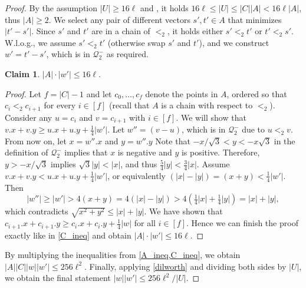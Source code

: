 \documentclass[11pt, letterpaper]{article}
\theoremstyle{plain}
\theoremstyle{definition}
\newtheorem{claim}{Claim}
\theoremstyle{remark}
\newcommand{\Q}{\mathcal{Q}}
\newcommand{\absolute}[1]{\left\lvert#1\right\rvert}
\begin{document}
\begin{proof}
By the assumption $\absolute{U} \ge 16\ell$ and , it holds
$16 \ell \le \absolute{U} \le \absolute{C} \absolute{A} < 16\ell\absolute{A}$,
thus $\absolute{A} \ge 2$.
We select any pair of different vectors $s', t' \in A$ that minimizes $\absolute{t' - s'}$. Since $s'$ and $t'$ are in a chain of $<_2$, it holds either $s' <_2 t'$ or $t' <_2 s'$. W.l.o.g., we assume $s' <_2 t'$ (otherwise swap $s'$ and $t'$), and we construct $w' = t' - s'$, which is in $\Q_2^-$ as required.

\begin{claim}\label{A_ineq}
	$\absolute{A}\cdot \absolute{w'} \leq 16\ell$. 
	\begin{proof}
	
		Let $f = \absolute{C} - 1$ and
		let $c_0, \dots, c_{f}$ denote the points in $A$, ordered so that $c_i <_2 c_{i + 1}$ for every $i \in [f]$ (recall that $A$ is a chain with respect to $<_2$).
		Consider any $u = c_i$ and $v = c_{i + 1}$ with $i \in [f]$. We will show that $v.x + v.y \geq u.x + u.y + \frac14\absolute{w'}$. 		
		Let $w'' = (v - u)$, which is in $\Q_2^-$ due to $u <_2 v$. From now on, let $x = w''.x$ and $y = w''.y$
		Note that $-x/\sqrt{3} < y < -x \sqrt{3}$ in the definition of $\Q_2^-$ implies that $x$ is negative and $y$ is positive.
		Therefore, $y > -x/\sqrt{3}$ implies $\sqrt{3}\absolute{y} < \absolute{x}$, and thus $\frac 5 4\absolute{y} < \frac 3 4\absolute{x}$.
		Assume $v.x + v.y < u.x + u.y + \frac14\absolute{w'}$, or equivalently $(\absolute{x} - \absolute{y}) = (x + y) < \frac14\absolute{w'}$. Then $$\absolute{w''} \geq \absolute{w'} > 4(x + y) = 4(\absolute{x} - \absolute{y}) > 4(\tfrac14\absolute{x} + \tfrac14\absolute{y}) = 
		\absolute{x} + \absolute{y},$$
		which contradicts $\sqrt{x^2 + y^2} \leq \absolute{x} + \absolute{y}$. We have shown that $c_{i + 1}.x + c_{i + 1}.y \geq c_i.x + c_i.y + \frac14\absolute{w}$ for all $i \in [f]$. Hence we can finish the proof exactly like in \cref{C_ineq} and obtain $\absolute{A}\cdot \absolute{w'} \leq 16\ell$.
	\end{proof}
\end{claim}

By multiplying the inequalities from \cref{A_ineq,C_ineq}, we obtain $\absolute{A}\absolute{C}\absolute{w}\absolute{w'} \leq 256\ell^2$. Finally, applying \cref{dilworth} and dividing both sides by $\absolute{U}$, we obtain the final statement $\absolute{w}\absolute{w'} \leq 256\ell^2/\absolute{U}$.


\end{proof}
\end{document}
